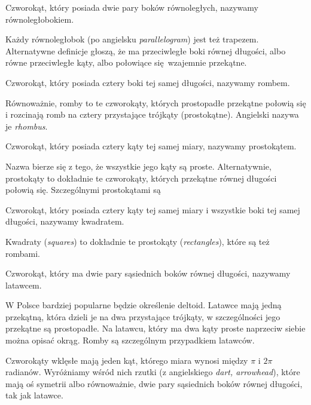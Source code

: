 \begin{definition}[równoległobok]
	Czworokąt, który posiada dwie pary boków równoległych, nazywamy równoległobokiem.
\end{definition}

Każdy równoległobok (po angielsku \emph{parallelogram}) jest też trapezem.
Alternatywne definicje głoszą, że ma przeciwległe boki równej długości, albo równe przeciwległe kąty, albo połowiące się wzajemnie przekątne.

\begin{definition}[romb]
	Czworokąt, który posiada cztery boki tej samej długości, nazywamy rombem.
\end{definition}

Równoważnie, romby to te czworokąty, których prostopadłe przekątne połowią się i rozcinają romb na cztery przystające trójkąty (prostokątne).
Angielski nazywa je \emph{rhombus}.

\begin{definition}[prostokąt]
	Czworokąt, który posiada cztery kąty tej samej miary, nazywamy prostokątem.
\end{definition}

Nazwa bierze się z tego, że wszystkie jego kąty są proste.
Alternatywnie, prostokąty to dokładnie te czworokąty, których przekątne równej długości połowią się.
Szczególnymi prostokątami są

\begin{definition}[kwadrat]
	Czworokąt, który posiada cztery kąty tej samej miary i wszystkie boki tej samej długości, nazywamy kwadratem.
\end{definition}

Kwadraty (\emph{squares}) to dokładnie te prostokąty (\emph{rectangles}), które są też rombami.

\begin{definition}[latawiec]
	Czworokąt, który ma dwie pary sąsiednich boków równej długości, nazywamy latawcem.
\end{definition}

W Polsce bardziej popularne będzie określenie deltoid.
Latawce mają jedną przekątną, która dzieli je na dwa przystające trójkąty, w szczególności jego przekątne są prostopadłe.
Na latawcu, który ma dwa kąty proste naprzeciw siebie można opisać okrąg.
Romby są szczególnym przypadkiem latawców.

Czworokąty wklęsłe mają jeden kąt, którego miara wynosi między $\pi$ i $2\pi$ radianów.
Wyróżniamy wśród nich rzutki (z angielskiego \emph{dart, arrowhead}), które mają oś symetrii albo równoważnie, dwie pary sąsiednich boków równej długości, tak jak latawce.


